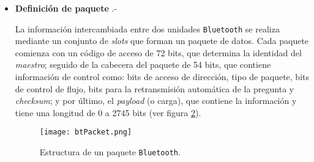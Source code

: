 \begin{itemize}
Dos o más unidades \texttt{Bluetooth} pueden compartir el mismo canal dentro
de una \emph{piconet}\footnote{Red formada por dos o más unidades
\texttt{Bluetooth} que comparten un mismo canal.}, donde una actúa como
\emph{maestra}, controlando el tráfico que se genera entre las demás unidades,
que actúan como \emph{esclavas}, enviando y recibiendo señales hacia la
unidad \emph{maestra}. El salto de frecuencia del canal está determinado por
la secuencia de la señal, es decir, por el orden en que llegan los saltos y
por la fase de esta secuencia. En \texttt{Bluetooth}, la secuencia queda fijada
por la identidad de la unidad maestra de la \emph{piconet} (un código único
para cada equipo) y por su frecuencia de reloj. Por lo que, para que una unidad
\emph{esclava} pueda sincronizarse con una unidad \emph{maestra}, debe añadir
un ajuste a su propio reloj y así poder compartir la misma portadora de salto.

  \begin{figure}[H]
    \begin{center}
      \texttt{[image: btExample.png]}
      \caption{Red \texttt{Bluetooth} formada por varios dispositivos. El
      portátil ejerce de \emph{maestro}.}
      \label{fig:btExample}
    \end{center}
  \end{figure}

\item \textbf{Definición de paquete} .-

La información intercambiada entre dos unidades \texttt{Bluetooth} se realiza
mediante un conjunto de \emph{slots} que forman un paquete de datos.
Cada paquete comienza con un código de acceso de 72 bits, que
determina la identidad del \emph{maestro}; seguido de la cabecera del
paquete de 54 bits, que contiene información de control como: bits de
acceso de dirección, tipo de paquete, bits de control de flujo, bits para la 
retransmisión automática de la pregunta y \emph{checksum}; y por último, el
\emph{payload} (o carga), que contiene la información y tiene una longitud de
0 a 2745 bits (ver figura \ref{fig:btPacket}).

  \begin{figure}[H]
    \begin{center}
      \texttt{[image: btPacket.png]}
      \caption{Estructura de un paquete \texttt{Bluetooth}.}
      \label{fig:btPacket}
    \end{center}
  \end{figure}


\end{itemize}
